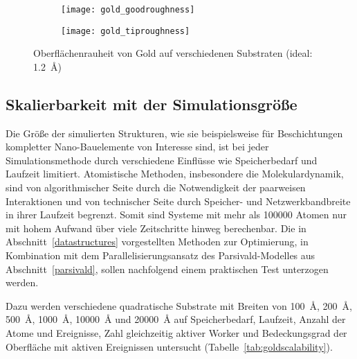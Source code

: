 \begin{figure}
  \captionsetup[subfigure]{singlelinecheck=false}
  \def\subfigwidth{0.49\textwidth}

  \begin{subfigure}[t]{\subfigwidth}
    \texttt{[image: gold\_goodroughness]}
    \label{fig:goldroughness-a}
  \end{subfigure}
  \hfill
  \begin{subfigure}[t]{\subfigwidth}
    \texttt{[image: gold\_tiproughness]}
    \label{fig:goldroughness-b}
  \end{subfigure}

  \caption[Oberflächenrauheit von Gold]{
    Oberflächenrauheit von Gold auf verschiedenen Substraten (ideal: \SI{1.2}{\angstrom})
  }
  \label{fig:goldroughness}

\end{figure}

\subsection{Skalierbarkeit mit der Simulationsgröße}
\label{goldscalability}

Die Größe der simulierten Strukturen, wie sie beispielsweise für Beschichtungen kompletter Nano-Bauelemente von Interesse sind, ist bei jeder Simulationsmethode durch verschiedene Einflüsse wie Speicherbedarf und Laufzeit limitiert.
Atomistische Methoden, insbesondere die Molekulardynamik, sind von algorithmischer Seite durch die Notwendigkeit der paarweisen Interaktionen und von technischer Seite durch Speicher- und Netzwerkbandbreite in ihrer Laufzeit begrenzt.
Somit sind Systeme mit mehr als \num{100000} Atomen nur mit hohem Aufwand über viele Zeitschritte hinweg berechenbar.
Die in Abschnitt~\ref{datastructures} vorgestellten Methoden zur Optimierung, in Kombination mit dem Parallelisierungsansatz des Parsivald-Modelles aus Abschnitt~\ref{parsivald}, sollen nachfolgend einem praktischen Test unterzogen werden.

Dazu werden verschiedene quadratische Substrate mit Breiten von \SI{100}{\angstrom}, \SI{200}{\angstrom}, \SI{500}{\angstrom}, \SI{1000}{\angstrom}, \SI{10000}{\angstrom} und \SI{20000}{\angstrom} auf Speicherbedarf, Laufzeit, Anzahl der Atome und Ereignisse, Zahl gleichzeitig aktiver Worker und Bedeckungsgrad der Oberfläche mit aktiven Ereignissen untersucht (Tabelle~\ref{tab:goldscalability}).

